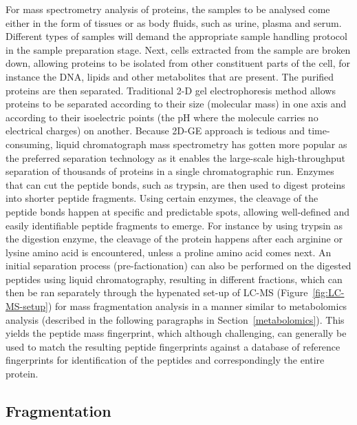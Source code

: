 For mass spectrometry analysis of proteins, the samples to be analysed come either in the form of tissues or as body fluids, such as urine, plasma and serum. Different types of samples will demand the appropriate sample handling protocol in the sample preparation stage. Next, cells extracted from the sample are broken down, allowing proteins to be isolated from other constituent parts of the cell, for instance the DNA, lipids and other metabolites that are present. The purified proteins are then separated. Traditional 2-D gel electrophoresis method allows proteins to be separated according to their size (molecular mass) in one axis and according to their isoelectric points (the pH where the molecule carries no electrical charges) on another. Because 2D-GE approach is tedious and time-consuming, liquid chromatograph mass spectrometry has gotten more popular as the preferred separation technology as it enables the large-scale high-throughput separation of thousands of proteins in a single chromatographic run. Enzymes that can cut the peptide bonds, such as trypsin, are then used to digest proteins into shorter peptide fragments. Using certain enzymes, the cleavage of the peptide bonds happen at specific and predictable spots, allowing well-defined and easily identifiable peptide fragments to emerge. For instance by using trypsin as the digestion enzyme, the cleavage of the protein happens after each arginine or lysine amino acid is encountered, unless a proline amino acid comes next. An initial separation process (pre-factionation) can also be performed on the digested peptides using liquid chromatography, resulting in different fractions, which can then be ran separately through the hypenated set-up of LC-MS (Figure~\ref{fig:LC-MS-setup}) for mass fragmentation analysis in a manner similar to metabolomics analysis (described in the following paragraphs in Section~\ref{metabolomics}). This yields the peptide mass fingerprint, which although challenging, can generally be used to match the resulting peptide fingerprints against a database of reference fingerprints for identification of the peptides and correspondingly the entire protein. 

\subsection{Fragmentation\label{sub:fragmentation-background}}


